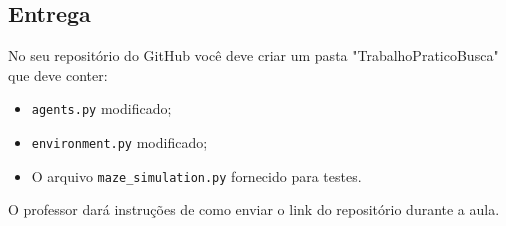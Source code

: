 \documentclass{article}
\begin{document}
\subsection*{Entrega}

No seu repositório do GitHub você deve criar um pasta "TrabalhoPraticoBusca" que deve conter:
\begin{itemize}
    \item \texttt{agents.py} modificado;
    \item \texttt{environment.py} modificado;
    \item O arquivo \texttt{maze\_simulation.py} fornecido para testes.
\end{itemize}

O professor dará instruções de como enviar o link do repositório durante a aula. 
\end{document}
